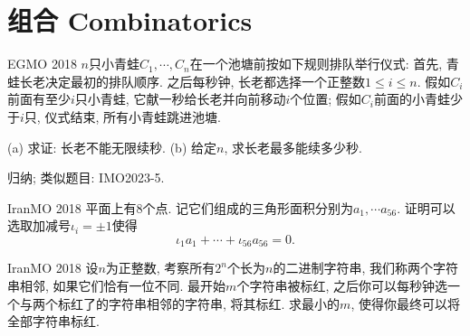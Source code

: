 \chapter{组合 Combinatorics}

\begin{problem}{EGMO 2018}
	$n$只小青蛙$C_1,\cdots ,C_n$在一个池塘前按如下规则排队举行仪式: 首先, 青蛙长老决定最初的排队顺序. 之后每秒钟, 长老都选择一个正整数$1 \leq i \leq n$. 假如$C_i$前面有至少$i$只小青蛙, 它献一秒给长老并向前移动$i$个位置; 假如$C_i$前面的小青蛙少于$i$只, 仪式结束, 所有小青蛙跳进池塘. 
	
	(a) 求证: 长老不能无限续秒. \quad (b) 给定$n$, 求长老最多能续多少秒. 
\end{problem}
\begin{remark}
	归纳; 类似题目: IMO2023-5. 
\end{remark}

\begin{problem}{IranMO 2018}
	平面上有$8$个点. 记它们组成的三角形面积分别为$a_1, \cdots a_{56}$. 证明可以选取加减号$\iota _{i}=\pm 1$使得$$\iota _1 a_1 + \cdots + \iota _{56} a_{56} = 0.$$
\end{problem}

\begin{problem}{IranMO 2018}
	设$n$为正整数, 考察所有$2^n$个长为$n$的二进制字符串, 我们称两个字符串相邻, 如果它们恰有一位不同. 最开始$m$个字符串被标红, 之后你可以每秒钟选一个与两个标红了的字符串相邻的字符串, 将其标红. 求最小的$m$, 使得你最终可以将全部字符串标红. 
\end{problem}








